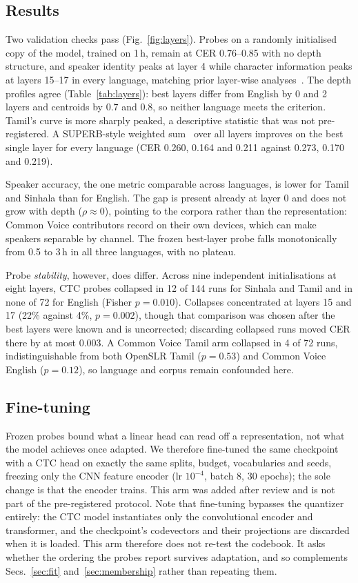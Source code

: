 \documentclass{article}
\begin{document}
\subsection{Results}

Two validation checks pass (Fig.~\ref{fig:layers}). Probes on a randomly initialised copy of the model, trained on 1\,h, remain at CER 0.76--0.85 with no depth structure, and speaker identity peaks at layer 4 while character information peaks at layers 15--17 in every language, matching prior layer-wise analyses~\cite{pasad2021layerwise,pasad2023comparative}. The depth profiles agree (Table~\ref{tab:layers}): best layers differ from English by 0 and 2 layers and centroids by 0.7 and 0.8, so neither language meets the criterion. Tamil's curve is more sharply peaked, a descriptive statistic that was not pre-registered. A SUPERB-style weighted sum~\cite{yang2021superb} over all layers improves on the best single layer for every language (CER 0.260, 0.164 and 0.211 against 0.273, 0.170 and 0.219).

Speaker accuracy, the one metric comparable across languages, is lower for Tamil and Sinhala than for English. The gap is present already at layer 0 and does not grow with depth ($\rho\approx0$), pointing to the corpora rather than the representation: Common Voice contributors record on their own devices, which can make speakers separable by channel. The frozen best-layer probe falls monotonically from 0.5 to 3\,h in all three languages, with no plateau.

Probe \emph{stability}, however, does differ. Across nine independent initialisations at eight layers, CTC probes collapsed in 12 of 144 runs for Sinhala and Tamil and in none of 72 for English (Fisher $p=0.010$). Collapses concentrated at layers 15 and 17 (22\% against 4\%, $p=0.002$), though that comparison was chosen after the best layers were known and is uncorrected; discarding collapsed runs moved CER there by at most 0.003. A Common Voice Tamil arm collapsed in 4 of 72 runs, indistinguishable from both OpenSLR Tamil ($p=0.53$) and Common Voice English ($p=0.12$), so language and corpus remain confounded here.

\subsection{Fine-tuning}
\label{sec:finetune}

Frozen probes bound what a linear head can read off a representation, not what the model achieves once adapted. We therefore fine-tuned the same checkpoint with a CTC head on exactly the same splits, budget, vocabularies and seeds, freezing only the CNN feature encoder (lr $10^{-4}$, batch 8, 30 epochs); the sole change is that the encoder trains. This arm was added after review and is not part of the pre-registered protocol. Note that fine-tuning bypasses the quantizer entirely: the CTC model instantiates only the convolutional encoder and transformer, and the checkpoint's codevectors and their projections are discarded when it is loaded. This arm therefore does not re-test the codebook. It asks whether the ordering the probes report survives adaptation, and so complements Secs.~\ref{sec:fit} and~\ref{sec:membership} rather than repeating them.
\end{document}
